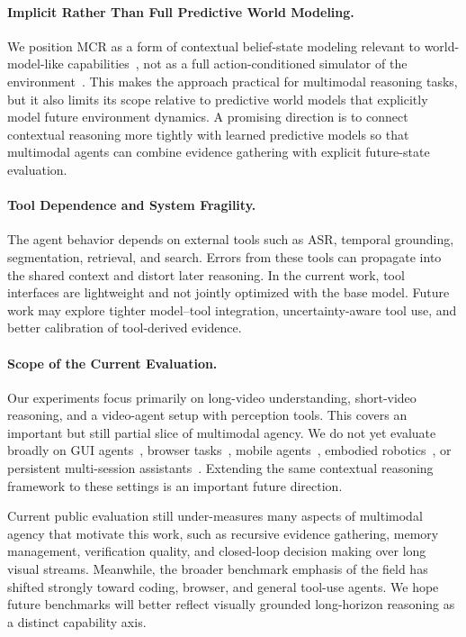 \documentclass[11pt, letterpaper]{template}
\theoremstyle{plain}
\theoremstyle{definition}
\theoremstyle{remark}
\begin{document}
\paragraph{Implicit Rather Than Full Predictive World Modeling.}
We position MCR as a form of contextual belief-state modeling relevant to world-model-like capabilities~\citep{vjepa,vjepa2}, not as a full action-conditioned simulator of the environment~\citep{hafner2019dream,hafner2023mastering}. This makes the approach practical for multimodal reasoning tasks, but it also limits its scope relative to predictive world models that explicitly model future environment dynamics. A promising direction is to connect contextual reasoning more tightly with learned predictive models so that multimodal agents can combine evidence gathering with explicit future-state evaluation.

\paragraph{Tool Dependence and System Fragility.}
The agent behavior depends on external tools such as ASR, temporal grounding, segmentation, retrieval, and search. Errors from these tools can propagate into the shared context and distort later reasoning. In the current work, tool interfaces are lightweight and not jointly optimized with the base model. Future work may explore tighter model--tool integration, uncertainty-aware tool use, and better calibration of tool-derived evidence.

\paragraph{Scope of the Current Evaluation.}
Our experiments focus primarily on long-video understanding, short-video reasoning, and a video-agent setup with perception tools. This covers an important but still partial slice of multimodal agency. We do not yet evaluate broadly on GUI agents~\citep{xie2024osworld,bonatti2024windows}, browser tasks~\citep{zhou2024webarena,koh2024visualwebarena}, mobile agents~\citep{deng2024mobile,rawles2025androidworld}, embodied robotics~\citep{shridhar2020alfred,yang2025embodiedbench}, or persistent multi-session assistants~\citep{wu2024longmemeval,maharana2024evaluating}. Extending the same contextual reasoning framework to these settings is an important future direction.

Current public evaluation still under-measures many aspects of multimodal agency that motivate this work, such as recursive evidence gathering, memory management, verification quality, and closed-loop decision making over long visual streams. Meanwhile, the broader benchmark emphasis of the field has shifted strongly toward coding, browser, and general tool-use agents. We hope future benchmarks will better reflect visually grounded long-horizon reasoning as a distinct capability axis.
\end{document}

